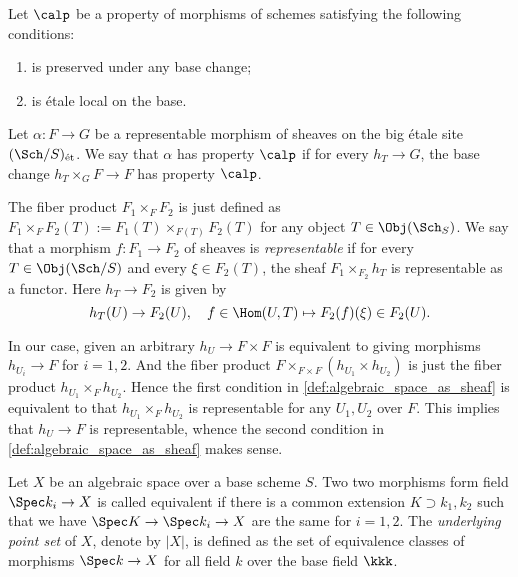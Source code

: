     \begin{definition}\label{def:properties_of_sheaves_by_scheme}
        Let \(\calp\) be a property of morphisms of schemes satisfying the following conditions:
        \begin{enumerate}
            \item is preserved under any base change;
            \item is \'etale local on the base.
        \end{enumerate}
        Let \(\alpha: F \to G\) be a representable morphism of sheaves on the big \'etale site \((\Sch/S)_{\text{\'et}}\).
        We say that \(\alpha\) has property \(\calp\) if for every \(h_T \to G\), the base change \(h_T\times_{G} F \to F\) has property \(\calp\).
    \end{definition}

    \begin{remark}
        The fiber product \(F_1 \times_F F_2\) is just defined as \(F_1 \times_F F_2(T) := F_1(T) \times_{F(T)} F_2(T)\) for any object \(T \in \Obj(\Sch_S)\).
        We say that a morphism \(f: F_1 \to F_2\) of sheaves is \emph{representable} if for every \(T \in \Obj(\Sch/S)\) and every \(\xi \in F_2(T)\), the sheaf \(F_1 \times_{F_2} h_T\) is representable as a functor.
        Here \(h_T \to F_2\) is given by 
        \[ h_T(U) \to F_2(U), \quad f \in \Hom(U,T) \mapsto F_2(f)(\xi) \in F_2(U). \]

        In our case, given an arbitrary \(h_U \to F \times F\) is equivalent to giving morphisms \(h_{U_i} \to F\) for \(i=1,2\).
        And the fiber product \(F \times_{F \times F} (h_{U_1} \times h_{U_2})\) is just the fiber product \(h_{U_1} \times_{F} h_{U_2}\).
        Hence the first condition in \cref{def:algebraic_space_as_sheaf} is equivalent to that \(h_{U_1} \times_F h_{U_2}\) is representable for any \(U_1,U_2\) over \(F\).
        This implies that \(h_U \to F\) is representable, whence the second condition in \cref{def:algebraic_space_as_sheaf} makes sense.
    \end{remark}

    \begin{definition}\label{def:underlying_set_of_algebraic_space}
        Let \(X\) be an algebraic space over a base scheme \(S\).
        Two two morphisms form field \(\Spec k_i \to X\) is called equivalent if there is a common extension \(K \supset k_1,k_2\) such that we have \(\Spec K \to \Spec k_i \to X\) are the same for \(i=1,2\).
        The \emph{underlying point set} of \(X\), denote by \(|X|\), is defined as the set of equivalence classes of morphisms \(\Spec k \to X\) for all field \(k\) over the base field \(\kkk\).
    \end{definition}

